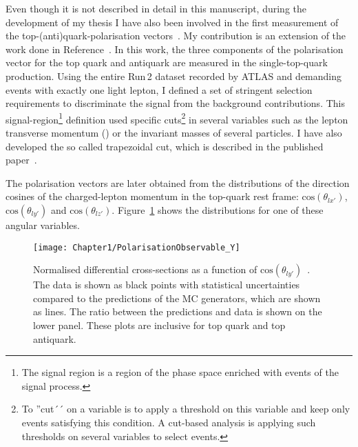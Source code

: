 Even though it is not described in detail in this manuscript, during the development 
of my thesis I have also been involved in the first measurement of the top-(anti)quark-polarisation 
vectors~\cite{ATLAS:2022vym}. 
My contribution is an extension of the work done in Reference~\cite{Martinez-Agullo:2017lty}.
In this work, the three components of the polarisation 
vector for the top quark and antiquark are measured in the single-top-quark \tchannel production. Using the 
entire Run$\,$2 dataset recorded by ATLAS and demanding events with exactly one light lepton,
I defined a set of stringent selection requirements to discriminate the \tchannel signal 
from the background contributions. This signal-region\footnote{The signal region is a 
region of the phase space enriched with events of the signal process.}
definition used specific cuts\footnote{To ''cut´´ on a variable is to apply a threshold on this variable and
keep only events satisfying this condition. A cut-based analysis is
applying such thresholds on several variables to select events.}
 in several variables such as the lepton transverse momentum (\pT) or the invariant masses of several particles.
I have also developed the so called trapezoidal cut, which is described in the published 
paper~\cite{ATLAS:2022vym}.  

The polarisation vectors are later obtained from the distributions 
of the direction cosines of the charged-lepton momentum in the top-quark rest frame:
$\text{cos}(\theta_{lx'})$, $\text{cos}(\theta_{ly'})$ and $\text{cos}(\theta_{lz'})$. 
Figure~\ref{fig:Chap1:Polarisation:Observables} shows the distributions for one of these angular 
variables.

\begin{figure}[h]
\centering
	\texttt{[image: Chapter1/PolarisationObservable\_Y]}\hfill
	\caption{Normalised differential cross-sections as a function of $\text{cos}(\theta_{ly'})$~\cite{ATLAS:2022vym}. 
	The data is shown as black points with statistical uncertainties compared to the 
	predictions of the MC generators, which are shown as lines. The ratio between the
	predictions and data is shown on the lower panel. 
	These plots are inclusive for top quark and top antiquark.} 
	\label{fig:Chap1:Polarisation:Observables}
\end{figure} 

